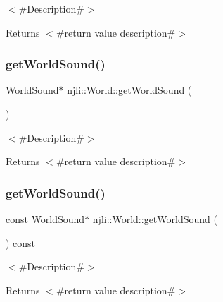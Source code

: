 $<$\#\+Description\#$>$

\begin{DoxyReturn}{Returns}
$<$\#return value description\#$>$ 
\end{DoxyReturn}
\mbox{\label{classnjli_1_1_world_aeafce2408df830b6d0d4f4cc70a502f6}} 
\subsubsection{\texorpdfstring{get\+World\+Sound()}{getWorldSound()}\hspace{0.1cm}{\footnotesize\ttfamily [1/2]}}
{\footnotesize\ttfamily \mbox{\hyperlink{classnjli_1_1_world_sound}{World\+Sound}}$\ast$ njli\+::\+World\+::get\+World\+Sound (\begin{DoxyParamCaption}{ }\end{DoxyParamCaption})}

$<$\#\+Description\#$>$

\begin{DoxyReturn}{Returns}
$<$\#return value description\#$>$ 
\end{DoxyReturn}
\mbox{\label{classnjli_1_1_world_aa0df2fe274aae44a7c3f4df0bfc2b2c8}} 
\subsubsection{\texorpdfstring{get\+World\+Sound()}{getWorldSound()}\hspace{0.1cm}{\footnotesize\ttfamily [2/2]}}
{\footnotesize\ttfamily const \mbox{\hyperlink{classnjli_1_1_world_sound}{World\+Sound}}$\ast$ njli\+::\+World\+::get\+World\+Sound (\begin{DoxyParamCaption}{ }\end{DoxyParamCaption}) const}

$<$\#\+Description\#$>$

\begin{DoxyReturn}{Returns}
$<$\#return value description\#$>$ 
\end{DoxyReturn}
\mbox{\label{classnjli_1_1_world_a322956de68eb15d43bfb39083942edee}} 
